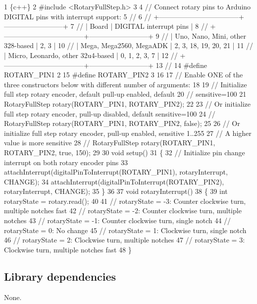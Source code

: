 \begin{DoxyCode}
1 \{c++\}
2 #include <RotaryFullStep.h>
3 
4 // Connect rotary pins to Arduino DIGITAL pins with interrupt support:
5 //
6 // +-----------------------------------+--------------------------+
7 // |              Board                |  DIGITAL interrupt pins  |
8 // +-----------------------------------+--------------------------+
9 // | Uno, Nano, Mini, other 328-based  |  2, 3                    |
10 // | Mega, Mega2560, MegaADK           |  2, 3, 18, 19, 20, 21    |
11 // | Micro, Leonardo, other 32u4-based |  0, 1, 2, 3, 7           |
12 // +-----------------------------------+--------------------------+
13 //
14 #define ROTARY\_PIN1   2
15 #define ROTARY\_PIN2   3
16 
17 // Enable ONE of the three constructors below with different number of arguments:
18 
19 // Initialize full step rotary encoder, default pull-up enabled, default 
20 // sensitive=100
21 RotaryFullStep rotary(ROTARY\_PIN1, ROTARY\_PIN2);
22 
23 // Or initialize full step rotary encoder, pull-up disabled, default sensitive=100
24 // RotaryFullStep rotary(ROTARY\_PIN1, ROTARY\_PIN2, false);
25 
26 // Or initialize full step rotary encoder, pull-up enabled, sensitive 1..255
27 // A higher value is more sensitive
28 // RotaryFullStep rotary(ROTARY\_PIN1, ROTARY\_PIN2, true, 150);
29 
30 void setup()
31 \{
32   // Initialize pin change interrupt on both rotary encoder pins
33   attachInterrupt(digitalPinToInterrupt(ROTARY\_PIN1), rotaryInterrupt, CHANGE);
34   attachInterrupt(digitalPinToInterrupt(ROTARY\_PIN2), rotaryInterrupt, CHANGE);
35 \}
36 
37 void rotaryInterrupt()
38 \{
39   int rotaryState = rotary.read();
40 
41   // rotaryState = -3: Counter clockwise turn, multiple notches fast
42   // rotaryState = -2: Counter clockwise turn, multiple notches
43   // rotaryState = -1: Counter clockwise turn, single notch
44   // rotaryState = 0:  No change
45   // rotaryState = 1:  Clockwise turn, single notch
46   // rotaryState = 2:  Clockwise turn, multiple notches
47   // rotaryState = 3:  Clockwise turn, multiple notches fast
48 \}
\end{DoxyCode}


\subsection*{Library dependencies}


\begin{DoxyItemize}
\item None.
\end{DoxyItemize}


